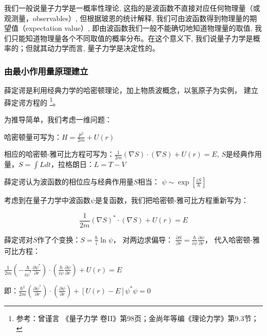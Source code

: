 我们一般说量子力学是一概率性理论,
这指的是波函数不直接对应任何物理量（或观测量，observables）,
但根据玻恩的统计解释, 我们可由波函数得到物理量的期望值（expectation
value）, 即由波函数我们一般不能确切地知道物理量的取值,
我们只能知道物理量各个不同取值的概率分布。在这个意义下,
我们说量子力学是概率的；但就其动力学而言, 量子力学是决定性的。


\subsubsection{由最小作用量原理建立}

薛定谔是利用经典力学的哈密顿理论，加上物质波概念，以氢原子为实例，
建立薛定谔方程的
\footnote{参考：曾谨言 《量子力学 卷II》第98页；金尚年等编《理论力学》第9.3节；}。

为推导简单，我们考虑一维问题：


哈密顿量可写为：$H = \frac{{p^2 }}{{2m}} + U(r)$

相应的哈密顿-雅可比方程可写为：$\frac{1}{{2m}}\left( {\nabla S} \right) \cdot \left( {\nabla S} \right) + U(r) = E$, $S$是经典作用量，$S = \int {Ldt} $，拉格朗日：$L=T-V$

薛定谔认为波函数的相位应与经典作用量$S$相当：
$\psi  \sim \exp \left[ {\frac{{iS}}{\hbar }} \right]$

考虑到在量子力学中波函数$\psi $是复函数，我们把哈密顿-雅可比方程重新写为：

\begin{center}
\begin{equation}
 \frac{1}{{2m}}\left( {\nabla S}  \right)^*  \cdot \left( {\nabla S} \right) + U(r) = E
\end{equation}
\end{center}

薛定谔对$S$作了个变换：$S = \frac{\hbar }{i}\ln \psi $，
对两边求偏导：
$\frac{{\partial S}}{{\partial r}} = \frac{\hbar }{{i\psi }}\frac{{\partial \psi }}{{\partial r}}$，
代入哈密顿-雅可比方程：

\begin{center}
$\frac{1}{{2m}}\left( { - \frac{\hbar }{{i\psi ^* }}\frac{{\partial \psi ^* }}{{\partial r}}} \right) \cdot \left( {\frac{\hbar }{{i\psi }}\frac{{\partial \psi }}{{\partial r}}} \right) + U(r) = E$
\end{center}

即：$\frac{{\hbar ^2 }}{{2m}}\left( {\frac{{\partial \psi ^* }}{{\partial r}}} \right) \cdot \left( {\frac{{\partial \psi }}{{\partial r}}} \right) + \left[ {U(r) - E} \right]\psi ^* \psi  = 0$

